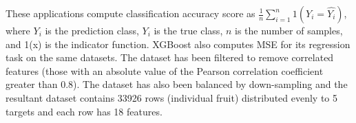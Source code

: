 These applications compute classification accuracy score
as $\frac{1}{n}\sum_{i=1}^{n}1(Y_i = \hat{Y_i})$, where $Y_i$ is the
prediction class, $Y_i$ is the true class, $n$ is the number of samples, and 1(x)
is the indicator function. XGBoost also computes MSE for its regression task
on the same datasets. The dataset has been filtered to remove correlated
features (those with an absolute value of the Pearson correlation coefficient
greater than 0.8). The dataset has also been balanced by down-sampling and the resultant dataset contains
33926 rows (individual fruit) distributed evenly to 5 targets and each row has
18 features.







